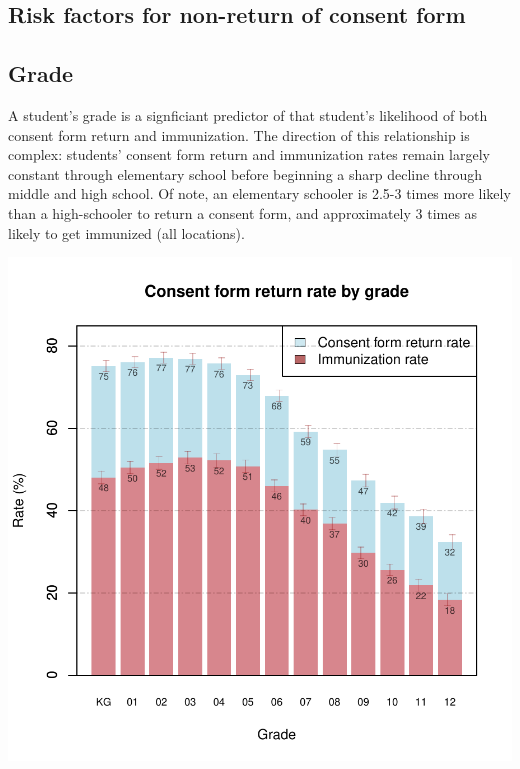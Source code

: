 \begin{center}
\section*{Risk factors for non-return of consent form}
\end{center}
\begin{multicols}{2}




\subsection*{Grade}

A student's grade is a signficiant predictor of that student's likelihood of both consent form return and immunization.  The direction of this relationship is complex: students' consent form return and immunization rates remain largely constant through elementary school before beginning a sharp decline through middle and high school.  Of note, an elementary schooler is 2.5-3 times more likely than a high-schooler to return a consent form, and approximately 3 times as likely to get immunized (all locations).  

\begin{center}
\includegraphics{targeting-002}
\end{center}


\end{multicols}

